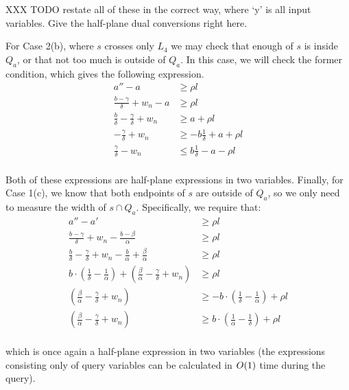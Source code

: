XXX TODO restate all of these in the correct way, where `y' is all input variables.  Give the half-plane dual conversions right here.

\noindent For Case 2(b), where $s$ crosses only $L_4$ we may check that enough of $s$ is inside $Q_a$, or that not too much is outside of $Q_a$. In this case, we will check the former condition, which gives the following expression.
\[
\begin{split}
a'' - a &\geq \rho l \\
%
\frac{b - \gamma}{\delta} + w_n - a &\geq \rho l \\
%
\frac{b}{\delta} - \frac{\gamma}{\delta} + w_n &\geq a + \rho l \\
%
- \frac{\gamma}{\delta} + w_n &\geq -b \frac{1}{\delta} + a + \rho l \\
%
\frac{\gamma}{\delta} - w_n &\leq b \frac{1}{\delta} - a - \rho l \\
%
\end{split}
\]

\noindent Both of these expressions are half-plane expressions in two variables.  Finally, for Case 1(c), we know that both endpoints of $s$ are outside of $Q_a$, so we only need to measure the width of $s \cap Q_a$.  Specifically, we require that:
\[
\begin{split} 
a'' - a' &\geq \rho l \\
%
\frac{b - \gamma}{\delta} + w_n - \frac{b - \beta}{\alpha} &\geq \rho l \\
%
\frac{b}{\delta} - \frac{\gamma}{\delta} + w_n - \frac{b}{\alpha} + \frac{\beta}{\alpha} &\geq \rho l \\
%
b \cdot \left ( \frac{1}{\delta} - \frac{1}{\alpha} \right ) + \left ( \frac{\beta}{\alpha} - \frac{\gamma}{\delta} + w_n \right ) &\geq \rho l \\
%
\left ( \frac{\beta}{\alpha} - \frac{\gamma}{\delta} + w_n \right ) &\geq -b \cdot \left (\frac{1}{\delta} - \frac{1}{\alpha} \right ) + \rho l \\
%
\left ( \frac{\beta}{\alpha} - \frac{\gamma}{\delta} + w_n \right ) &\geq b \cdot \left (\frac{1}{\alpha} - \frac{1}{\delta} \right ) + \rho l \\
%
\end{split}
\]

\noindent
which is once again a half-plane expression in two variables (the expressions consisting only of query variables can be calculated in $O\!\left(1\right)$ time during the query).


